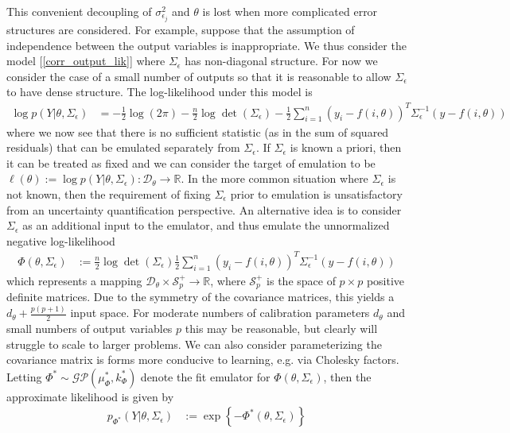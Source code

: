 \documentclass[12pt]{article}
\newcommand{\R}{\mathbb{R}}
\begin{document}
This convenient decoupling of $\sigma^2_{\epsilon_j}$ and $\theta$ is lost when 
more complicated error structures are considered. For example, suppose that the assumption of independence between the output variables is inappropriate. We thus 
consider the model [\ref{corr_output_lik}] where $\Sigma_\epsilon$ has non-diagonal structure. For now we consider the case of a small number of outputs so that 
it is reasonable to allow $\Sigma_\epsilon$ to have dense structure. The log-likelihood under this model is 
\begin{align}
\log p(Y|\theta, \Sigma_\epsilon) &= -\frac{1}{2} \log(2\pi) -\frac{n}{2} \log \det(\Sigma_\epsilon) - \frac{1}{2} \sum_{i = 1}^{n} (y_i - f(i, \theta))^T \Sigma_\epsilon^{-1} (y - f(i, \theta)) \label{log_lik_corr_outputs}
\end{align}
where we now see that there is no sufficient statistic (as in the sum of squared residuals) that can be emulated separately from $\Sigma_\epsilon$. If $\Sigma_\epsilon$
is known a priori, then it can be treated as fixed and we can consider the target of emulation to be 
$\ell(\theta) := \log p(Y|\theta, \Sigma_\epsilon): \mathcal{D}_\theta \to \R$. In the more common situation where $\Sigma_\epsilon$ is not known, then the requirement of 
fixing $\Sigma_\epsilon$ prior to emulation is unsatisfactory from an uncertainty quantification perspective. An alternative idea is to consider $\Sigma_\epsilon$ as an 
additional input to the emulator, and thus emulate the unnormalized negative log-likelihood
\begin{align}
\Phi(\theta, \Sigma_\epsilon) &:= \frac{n}{2} \log \det(\Sigma_\epsilon)  \frac{1}{2} \sum_{i = 1}^{n} (y_i - f(i, \theta))^T \Sigma_\epsilon^{-1} (y - f(i, \theta))
\end{align} 
which represents a mapping $\mathcal{D}_\theta \times \mathcal{S}^+_p \to \R$, where $\mathcal{S}^+_p$ is the space of $p \times p$ positive definite matrices. 
Due to the symmetry of the covariance matrices, this yields a $d_{\theta} + \frac{p(p + 1)}{2}$ input space. For moderate numbers of calibration parameters 
$d_\theta$ and small numbers of output variables $p$ this may be reasonable, but clearly will struggle to scale to larger problems. We can also consider parameterizing 
the covariance matrix is forms more conducive to learning, e.g. via Cholesky factors. Letting $\Phi^* \sim \mathcal{GP}(\mu_\Phi^*, k_\Phi^*)$ denote the fit emulator for
$\Phi(\theta, \Sigma_\epsilon)$, then the approximate likelihood is given by 
\begin{align}
p_{\Phi^*}(Y|\theta, \Sigma_\epsilon) &:= \exp\left\{-\Phi^*(\theta, \Sigma_\epsilon)\right\}
\end{align}
\end{document}
